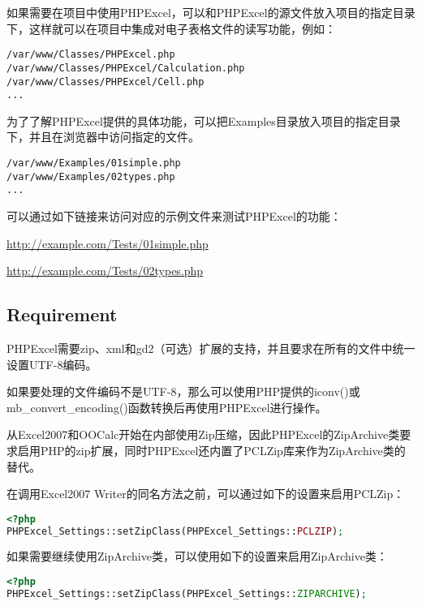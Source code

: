 如果需要在项目中使用PHPExcel，可以和PHPExcel的源文件放入项目的指定目录下，这样就可以在项目中集成对电子表格文件的读写功能，例如：

\begin{lstlisting}
/var/www/Classes/PHPExcel.php
/var/www/Classes/PHPExcel/Calculation.php
/var/www/Classes/PHPExcel/Cell.php
...
\end{lstlisting}

为了了解PHPExcel提供的具体功能，可以把Examples目录放入项目的指定目录下，并且在浏览器中访问指定的文件。

\begin{lstlisting}
/var/www/Examples/01simple.php
/var/www/Examples/02types.php
...
\end{lstlisting}

可以通过如下链接来访问对应的示例文件来测试PHPExcel的功能：

\begin{compactitem}
\item \url{http://example.com/Tests/01simple.php}
\item \url{http://example.com/Tests/02types.php}
\end{compactitem}




\subsection{Requirement}

PHPExcel需要zip、xml和gd2（可选）扩展的支持，并且要求在所有的文件中统一设置UTF-8编码。

如果要处理的文件编码不是UTF-8，那么可以使用PHP提供的iconv()或mb\_convert\_encoding()函数转换后再使用PHPExcel进行操作。


从Excel2007和OOCalc开始在内部使用Zip压缩，因此PHPExcel的ZipArchive类要求启用PHP的zip扩展，同时PHPExcel还内置了PCLZip库来作为ZipArchive类的替代。

在调用Excel2007 Writer的同名方法之前，可以通过如下的设置来启用PCLZip：

\begin{lstlisting}[language=PHP]
<?php
PHPExcel_Settings::setZipClass(PHPExcel_Settings::PCLZIP);
\end{lstlisting}

如果需要继续使用ZipArchive类，可以使用如下的设置来启用ZipArchive类：

\begin{lstlisting}[language=PHP]
<?php
PHPExcel_Settings::setZipClass(PHPExcel_Settings::ZIPARCHIVE);
\end{lstlisting}

